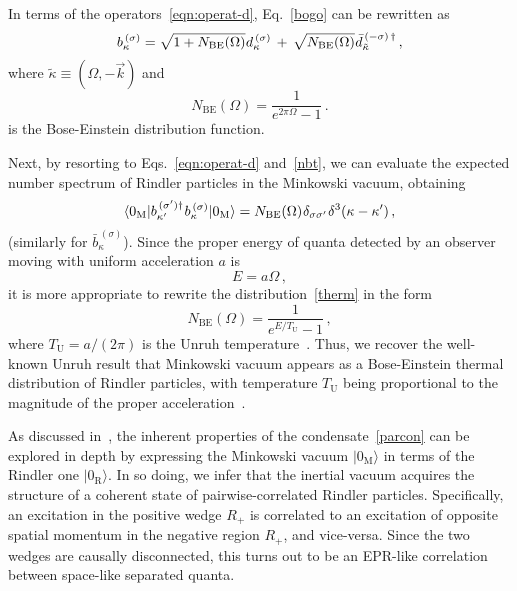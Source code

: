 \documentclass[floats,prd,aps,amssymb,nofootinbib,showkeys]{revtex4}
\newcommand{\be}{\begin{equation}}\newcommand{\ee}{\end{equation}}
\begin{document}
In terms of the operators~\eqref{eqn:operat-d}, 
Eq.~\eqref{bogo} can be rewritten as
\be
\label{nbt}
b_{\kappa}^{\,(\sigma)}=\sqrt{1+N_{\mathrm{BE}}(\Omega)}\hspace{0.1mm}d_{\kappa}^{\,(\sigma)}\,+\,\sqrt{N_{\mathrm{BE}}(\Omega)}\hspace{0.1mm}\bar d_{\tilde\kappa}^{\,(-\sigma)\,\dagger}\,,
\ee
where $\tilde\kappa\equiv(\Omega,-\vec{k})$ and
\be
\label{therm}
N_{\mathrm{BE}}(\Omega)=%
\frac{1}{e^{2\pi\Omega}-1}\,.
\ee
is the Bose-Einstein distribution function.

Next, by resorting to Eqs.~\eqref{eqn:operat-d} and~\eqref{nbt}, we can evaluate the expected number spectrum of Rindler particles in the
Minkowski vacuum, obtaining 
\be
\label{parcon}
\langle0_{\mathrm{M}}|b_{\kappa'}^{\,(\sigma')\dagger}\hspace{0.2mm}b_{\kappa}^{\,(\sigma)}|0_{\mathrm{M}}\rangle=N_{\mathrm{BE}}(\Omega)\hspace{0.2mm}\delta_{\sigma\sigma'}\hspace{0.2mm}\delta^3(\kappa-\kappa')\,,
\ee
(similarly for $\bar b_{\kappa}^{\,(\sigma)}$).
Since the proper energy of quanta detected by
an observer moving with uniform acceleration $a$
is 
\be 
\label{EnRind}
E=a\Omega\,,
\ee
it is more appropriate to rewrite the distribution~\eqref{therm}
in the form
\be
\label{newform}
N_{\mathrm{BE}}(\Omega)=\frac{1}{e^{E/T_{\mathrm{U}}}-1}\,,
\ee
where $T_{\mathrm{U}}=a/(2\pi)$ is the 
Unruh temperature~\cite{Unruh}. 
Thus, we recover the well-known
Unruh result that Minkowski vacuum appears
as a Bose-Einstein thermal distribution of Rindler particles, 
with temperature $T_{\mathrm{U}}$ being 
proportional to the magnitude of the proper
acceleration~\cite{Unruh}. 

As discussed in~\cite{Takagi}, 
the inherent properties of the 
condensate~\eqref{parcon} can be 
explored in depth 
by expressing the Minkowski vacuum $|0_\mathrm{M}\rangle$
in terms of the Rindler one $|0_\mathrm{R}\rangle$. 
In so doing, we infer that the inertial vacuum acquires the structure of 
a coherent state of pairwise-correlated Rindler particles. Specifically, 
an excitation in the positive wedge $R_+$ is 
correlated to an excitation of opposite spatial momentum 
in the negative region $R_+$, and vice-versa. 
Since the two wedges are causally disconnected, 
this turns out to be an EPR-like correlation
between space-like separated quanta. 
\end{document}
